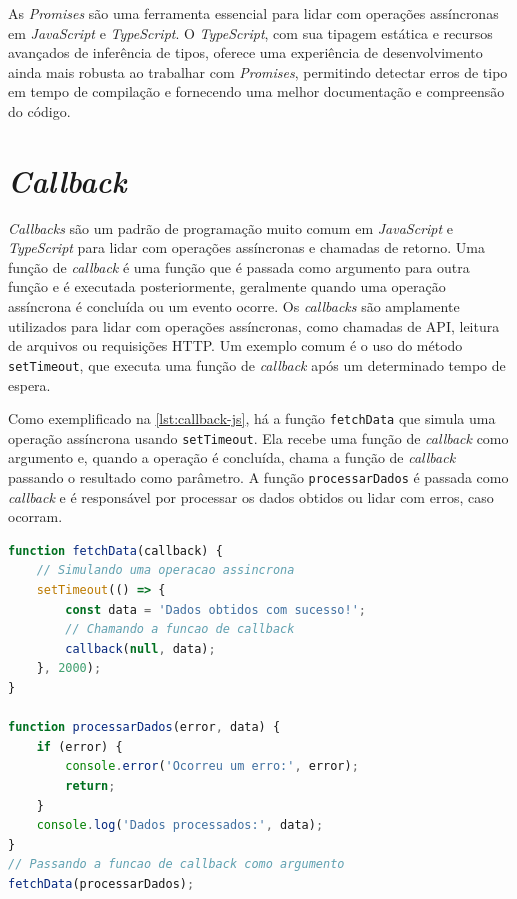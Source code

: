 As \textit{Promises} são uma ferramenta essencial para lidar com operações assíncronas em \textit{JavaScript} e \textit{TypeScript}. O \textit{TypeScript}, com sua tipagem estática e recursos avançados de inferência de tipos, oferece uma experiência de desenvolvimento ainda mais robusta ao trabalhar com \textit{Promises}, permitindo detectar erros de tipo em tempo de compilação e fornecendo uma melhor documentação e compreensão do código.



\section{\textit{Callback}}
\label{JS_callback}

\textit{Callbacks} são um padrão de programação muito comum em \textit{JavaScript} e \textit{TypeScript} para lidar com operações assíncronas e chamadas de retorno. Uma função de \textit{callback} é uma função que é passada como argumento para outra função e é executada posteriormente, geralmente quando uma operação assíncrona é concluída ou um evento ocorre. Os \textit{callbacks} são amplamente utilizados para lidar com operações assíncronas, como chamadas de API, leitura de arquivos ou requisições HTTP. Um exemplo comum é o uso do método \texttt{setTimeout}, que executa uma função de \textit{callback} após um determinado tempo de espera.

Como exemplificado na \autoref{lst:callback-js}, há a função \texttt{fetchData} que simula uma operação assíncrona usando \texttt{setTimeout}. Ela recebe uma função de \textit{callback} como argumento e, quando a operação é concluída, chama a função de \textit{callback} passando o resultado como parâmetro. A função \texttt{processarDados} é passada como \textit{callback} e é responsável por processar os dados obtidos ou lidar com erros, caso ocorram.

\begin{lstlisting}[language=TypeScript, caption={Exemplo de uso de \textit{callback} em \textit{JavaScript}}, label=lst:callback-js]
function fetchData(callback) {
    // Simulando uma operacao assincrona
    setTimeout(() => {
        const data = 'Dados obtidos com sucesso!';
        // Chamando a funcao de callback
        callback(null, data); 
    }, 2000);
}
    
function processarDados(error, data) {
    if (error) {
        console.error('Ocorreu um erro:', error);
        return;
    }  
    console.log('Dados processados:', data);
}
// Passando a funcao de callback como argumento
fetchData(processarDados); 
\end{lstlisting}


